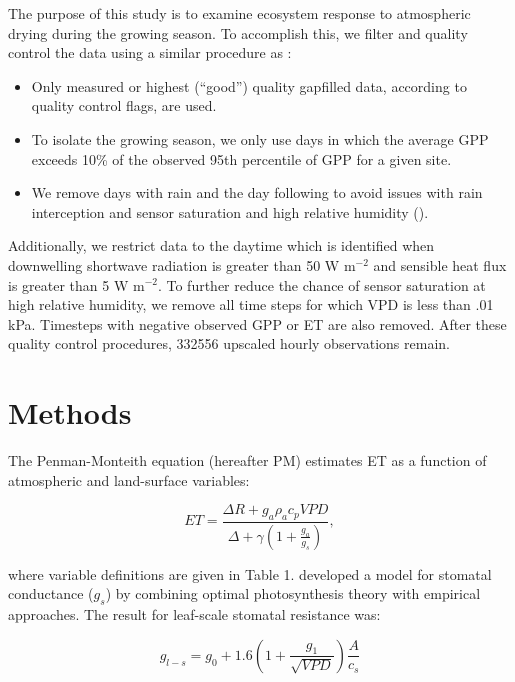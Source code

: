 \documentclass[draft,linenumbers]{agujournal}
\begin{document}
The purpose of this study is to examine ecosystem response to atmospheric drying during the growing season. To accomplish this, we filter and quality control the data using a similar procedure as \cite{Zhou_2015}:
\begin{itemize}
\item Only measured or highest (``good'') quality gapfilled data, according to quality control flags, are used.
\item To isolate the growing season, we only use days in which the average GPP exceeds 10\% of the observed 95th percentile of GPP for a given site.
\item We remove days with rain and the day following to avoid issues with rain interception and sensor saturation and high relative humidity (\cite{MEDLYN_2011}).
\end{itemize}
Additionally, we restrict data to the daytime which is identified when downwelling shortwave radiation is greater than 50 W m$^{-2}$ and sensible heat flux is greater than 5 W m$^{-2}$. To further reduce the chance of sensor saturation at high relative humidity, we remove all time steps for which VPD is less than .01 kPa. Timesteps with negative observed GPP or ET are also removed. After these quality control procedures, 332556 upscaled hourly observations remain. 

\section{Methods}
\label{methods}
The Penman-Monteith equation (hereafter PM) estimates ET as a function of atmospheric and land-surface variables:
\begin{linenomath*}
  \begin{equation}
      ET = \frac{\Delta R + g_a \rho_a c_p VPD}{\Delta + \gamma(1 + \frac{g_a}{g_s})},
  \end{equation}
\end{linenomath*}

 where variable definitions are given in Table 1. \citet{MEDLYN_2011} developed a model for stomatal conductance ($g_s$) by combining optimal photosynthesis theory with empirical approaches. The result for leaf-scale stomatal resistance was:

\begin{linenomath*}
  \begin{equation}
  g_{l-s} = g_0 + 1.6 \left(1 + \frac{g_1}{\sqrt{VPD}}\right) \frac{A}{c_s}
  \end{equation}
\end{linenomath*}
\end{document}
